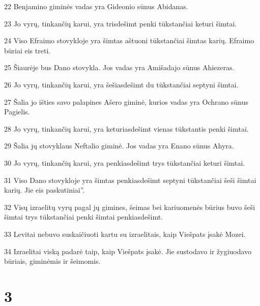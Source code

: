 \par 22 Benjamino giminės vadas yra Gideonio sūnus Abidanas. 
\par 23 Jo vyrų, tinkančių karui, yra trisdešimt penki tūkstančiai keturi šimtai. 
\par 24 Viso Efraimo stovykloje yra šimtas aštuoni tūkstančiai šimtas karių. Efraimo būriai eis treti. 
\par 25 Šiaurėje bus Dano stovykla. Jos vadas yra Amišadajo sūnus Ahiezeras. 
\par 26 Jo vyrų, tinkančių karui, yra šešiasdešimt du tūkstančiai septyni šimtai. 
\par 27 Šalia jo išties savo palapines Ašero giminė, kurios vadas yra Ochrano sūnus Pagielis. 
\par 28 Jo vyrų, tinkančių karui, yra keturiasdešimt vienas tūkstantis penki šimtai. 
\par 29 Šalia jų stovyklaus Neftalio giminė. Jos vadas yra Enano sūnus Ahyra. 
\par 30 Jo vyrų, tinkančių karui, yra penkiasdešimt trys tūkstančiai keturi šimtai. 
\par 31 Viso Dano stovykloje yra šimtas penkiasdešimt septyni tūkstančiai šeši šimtai karių. Jie eis paskutiniai”. 
\par 32 Visų izraelitų vyrų pagal jų gimines, šeimas bei kariuomenės būrius buvo šeši šimtai trys tūkstančiai penki šimtai penkiasdešimt. 
\par 33 Levitai nebuvo suskaičiuoti kartu su izraelitais, kaip Viešpats įsakė Mozei. 
\par 34 Izraelitai viską padarė taip, kaip Viešpats įsakė. Jie sustodavo ir žygiuodavo būriais, giminėmis ir šeimomis.



\chapter{3}


